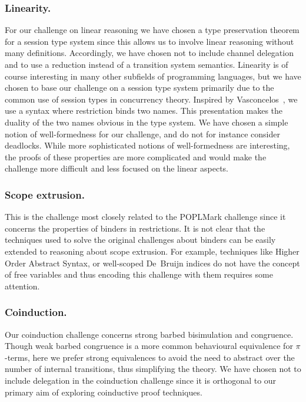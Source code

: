 \documentclass[runningheads]{llncs}
\begin{document}
\subsubsection{Linearity.}
For our challenge on linear reasoning we have chosen a type preservation theorem
for a session type system since this allows us to involve linear
reasoning without many definitions. Accordingly, we have chosen not to
include channel delegation and to use a reduction instead of a
transition system semantics.
Linearity is of course interesting in many other subfields of programming languages, but we have chosen to base our challenge on a session type system primarily due to the common use of session types in concurrency theory.
Inspired by Vasconcelos~\cite{Vasconcelos2012}, we use a syntax where
restriction binds two names. This presentation makes the duality
of the two names obvious in the type system.
We have chosen a simple notion of well-formedness for our challenge,
and do not for instance consider deadlocks. While more
sophisticated notions of well-formedness are interesting, the
proofs of these properties are more complicated and would make
the challenge more difficult and less focused on the linear
aspects.

\subsubsection{Scope extrusion.}
This is the challenge most closely related to the POPLMark
challenge since it concerns the properties of binders in restrictions.
It is not clear that the techniques used to solve the original challenges about binders can be easily extended to reasoning about scope extrusion.
For example, techniques like Higher Order Abstract Syntax, or well-scoped
De\ Bruijn indices do not have the concept of free variables and thus encoding this challenge with them requires some attention.

\subsubsection{Coinduction.}

Our coinduction challenge concerns strong barbed bisimulation and congruence.
Though weak barbed congruence is a more common behavioural equivalence for \(\pi\)-terms, here we prefer strong equivalences to avoid the need to abstract over the number of internal transitions, %
thus simplifying the theory.
We have chosen not to include delegation in the coinduction challenge since it is orthogonal to our primary aim of exploring coinductive proof techniques.
\end{document}
